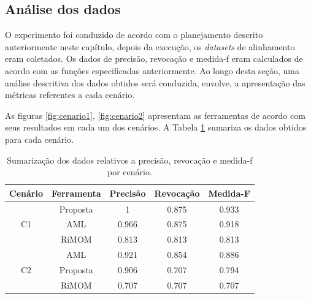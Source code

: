 \subsection{Análise dos dados}
O experimento foi conduzido de acordo com o planejamento descrito anteriormente neste capítulo, depois da execução, os \textit{datasets} de alinhamento eram coletados. Os dados de precisão, revocação e medida-f eram calculados de acordo com as funções especificadas anteriormente.
Ao longo desta seção, uma análise descritiva dos dados obtidos será conduzida, envolve, a apresentação das métricas referentes a cada cenário.

As figuras \ref{fig:cenario1}, \ref{fig:cenario2} apresentam as ferramentas de acordo com seus resultados em cada um dos cenários. A Tabela \ref{tab:resultados} sumariza os dados obtidos para cada cenário.

\begin{table}[h]
	\centering
	\caption{Sumarização dos dados relativos a precisão, revocação e medida-f por cenário.}
	\label{tab:resultados}
	\begin{tabular}{|c|c|c|c|c|}
		\hline
		      Cenário       & Ferramenta & Precisão & Revocação & Medida-F \\ \hline
		\multirow{3}{*}{C1} &  Proposta  &    1     &   0.875   &  0.933   \\ \cline{2-5}
		                    &    AML     &  0.966   &   0.875   &  0.918   \\ \cline{2-5}
		                    &   RiMOM    &  0.813   &   0.813   &  0.813   \\ \hline
		\multirow{3}{*}{C2} &    AML     &  0.921   &   0.854   &  0.886   \\ \cline{2-5}
		                    &  Proposta  &  0.906   &   0.707   &  0.794   \\ \cline{2-5}
		                    &   RiMOM    &  0.707   &   0.707   &  0.707   \\ \hline
	\end{tabular}
\end{table}

